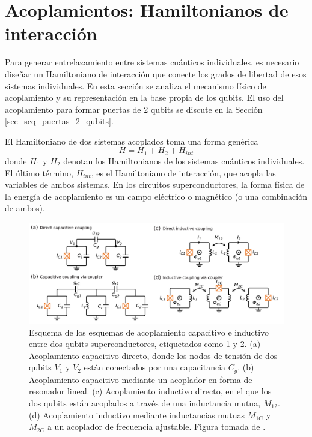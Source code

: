     


\newpage
\section{Acoplamientos: Hamiltonianos de interacción} \label{sec_scq_acoplamiento}

Para generar entrelazamiento entre sistemas cuánticos individuales, es necesario diseñar un Hamiltoniano de interacción que conecte los grados de libertad de esos sistemas individuales. En esta sección se analiza el mecanismo físico de acoplamiento y su representación en la base propia de los qubits. El uso del acoplamiento para formar puertas de 2 qubits se discute en la Sección \ref{sec_scq_puertas_2_qubits}.

El Hamiltoniano de dos sistemas acoplados toma una forma genérica
\begin{equation}
    H = H_1 + H_2 + H_{int}
\end{equation}
donde $H_1$ y $H_2$ denotan los Hamiltonianos de los sistemas cuánticos individuales. El último término, $H_{int}$, es el Hamiltoniano de interacción, que acopla las variables de ambos sistemas. En los circuitos superconductores, la forma física de la energía de acoplamiento es un campo eléctrico o magnético (o una combinación de ambos). 
    
\begin{figure}[h]
    \centering 
    \includegraphics[width=1\linewidth]{Figuras/Fig_scq_coupling.png}
    \caption{Esquema de los esquemas de acoplamiento capacitivo e inductivo entre dos qubits superconductores, etiquetados como 1 y 2. (a) Acoplamiento capacitivo directo, donde los nodos de tensión de dos qubits $V_1$ y $V_2$ están conectados por una capacitancia $C_g$. (b) Acoplamiento capacitivo mediante un acoplador en forma de resonador lineal. (c) Acoplamiento inductivo directo, en el que los dos qubits están acoplados a través de una inductancia mutua, $M_{12}$. (d) Acoplamiento inductivo mediante inductancias mutuas $M_{1C}$ y $M_{2C}$ a un acoplador de frecuencia ajustable.  Figura tomada de  \cite{bib_sqc_superinductor_paper}.}
    \label{Fig_scq_coupling}
\end{figure}    
    

